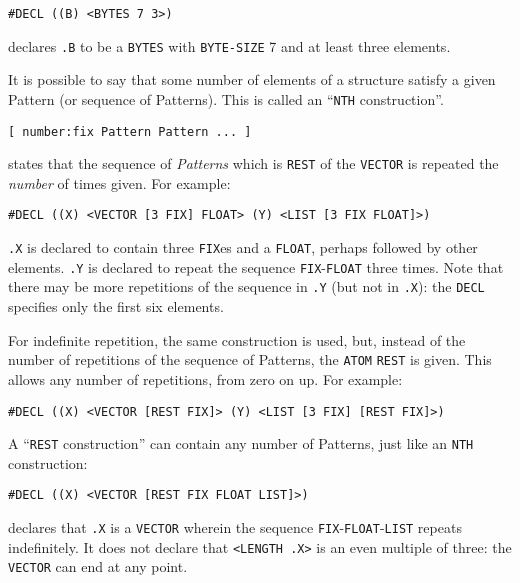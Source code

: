 \documentclass[a4paper,]{article}
\begin{document}
\begin{verbatim}
#DECL ((B) <BYTES 7 3>)
\end{verbatim}

declares \texttt{.B} to be a \texttt{BYTES} with \texttt{BYTE-SIZE} 7 and at least three elements.

It is possible to say that some number of elements of a structure satisfy a given Pattern (or sequence of Patterns). This
is called an ``\texttt{NTH} construction''.

\begin{verbatim}
[ number:fix Pattern Pattern ... ]
\end{verbatim}

states that the sequence of \emph{Patterns} which is \texttt{REST} of the \texttt{VECTOR} is
repeated the \emph{number} of times given. For example:

\begin{verbatim}
#DECL ((X) <VECTOR [3 FIX] FLOAT> (Y) <LIST [3 FIX FLOAT]>)
\end{verbatim}

\texttt{.X} is declared to contain three \texttt{FIX}es and a \texttt{FLOAT}, perhaps followed by other elements.
\texttt{.Y} is declared to repeat the sequence \texttt{FIX}-\texttt{FLOAT} three times. Note that there may be more
repetitions of the sequence in \texttt{.Y} (but not in \texttt{.X}): the \texttt{DECL} specifies only the first six
elements.

For indefinite repetition, the same construction is used, but, instead of the number of repetitions of the sequence of
Patterns, the \texttt{ATOM} \texttt{REST} is given. This allows any number of repetitions, from zero on up. For example:

\begin{verbatim}
#DECL ((X) <VECTOR [REST FIX]> (Y) <LIST [3 FIX] [REST FIX]>)
\end{verbatim}

A ``\texttt{REST} construction'' can contain any number of Patterns, just like an \texttt{NTH} construction:

\begin{verbatim}
#DECL ((X) <VECTOR [REST FIX FLOAT LIST]>)
\end{verbatim}

declares that \texttt{.X} is a \texttt{VECTOR} wherein the sequence \texttt{FIX}-\texttt{FLOAT}-\texttt{LIST} repeats
indefinitely. It does not declare that \texttt{\textless{}LENGTH\ .X\textgreater{}} is an even multiple of three: the
\texttt{VECTOR} can end at any point.
\end{document}
